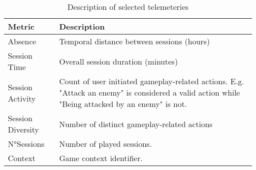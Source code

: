 \begin{table}[H] \centering
\caption[\textbf{Description of Selected Telemetries}]{Description of selected telemeteries}
\label{metricsdescription_1}
  \begin{tabularx}{\textwidth}{@{}lX@{}}
    \toprule
    \textbf{Metric}      & \textbf{Description}          \\ \midrule
    {Absence}    & Temporal distance between sessions (hours)  \\
    {Session Time}     & Overall session duration (minutes)       \\ 
    {Session Activity}    & Count of user initiated gameplay-related actions. E.g. "Attack an enemy" is considered a valid action while "Being attacked by an enemy" is not.\\
    {Session Diversity}      & Number of distinct gameplay-related actions  \\ 
    {N°Sessions}    & Number of played sessions.\\ 
    {Context}    &  Game context identifier.  \\
    \bottomrule
  \end{tabularx}
\end{table}